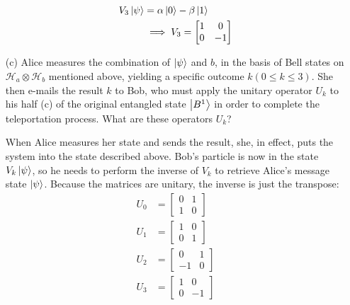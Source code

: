 \documentclass[a4paper,twoside]{article}
\begin{document}
\begin{itemize}
\begin{tcolorbox}[breakable]
\begin{align}
                V_3 \ket{\psi} &= \alpha \ket{0} - \beta \ket{1} \\
                & \implies V_3 = 
                \begin{bmatrix}
                    1&0\\
                    0&-1
                \end{bmatrix}\\
            \end{align}
        \end{tcolorbox}
    \item[(c)] Alice measures the combination of $ \ket{\psi} $ and $ b $, in the basis of Bell states on $ \mathcal{H}_{a} \otimes \mathcal{H}_{b} $ mentioned above, yielding a specific outcome $ k (0 \leq k \leq 3 ) $. She then e-mails the result $ k $ to Bob, who must apply the unitary operator $ U_k $ to his half (c) of the original entangled state $ \ket{B^1} $ in order to complete the teleportation process. What are these operators $ U_k $?
        \begin{tcolorbox}[breakable]
            When Alice measures her state and sends the result, she, in effect, puts the system into the state described above. Bob's particle is now in the state $ V_k \ket{\psi} $, so he needs to perform the inverse of $ V_k $ to retrieve Alice's message state $ \ket{\psi} $. Because the matrices are unitary, the inverse is just the transpose:
            \begin{align}
                U_0 &= 
                \begin{bmatrix}
                    0&1\\
                    1&0
                \end{bmatrix}\\
                U_1 &= 
                \begin{bmatrix}
                    1&0\\
                    0&1
                \end{bmatrix}\\
                U_2 &= 
                \begin{bmatrix}
                    0&1\\
                    -1&0
                \end{bmatrix}\\
                U_3 &= 
                \begin{bmatrix}
                    1&0\\
                    0&-1

\end{bmatrix}
\end{align}
\end{tcolorbox}
\end{itemize}
\end{document}

